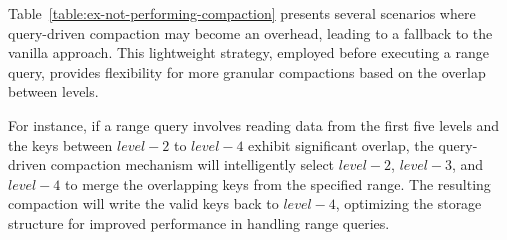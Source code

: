 Table~\ref{table:ex-not-performing-compaction} presents several scenarios where query-driven compaction may become an 
overhead, leading to a fallback to the vanilla approach. This lightweight strategy, employed before executing a range 
query, provides flexibility for more granular compactions based on the overlap between levels.

For instance, if a range query involves reading data from the first five levels and the keys between $level-2$ to 
$level-4$ exhibit significant overlap, the query-driven compaction mechanism will intelligently select $level-2$, 
$level-3$, and $level-4$ to merge the overlapping keys from the specified range. The resulting compaction will write 
the valid keys back to $level-4$, optimizing the storage structure for improved performance in handling range queries.

